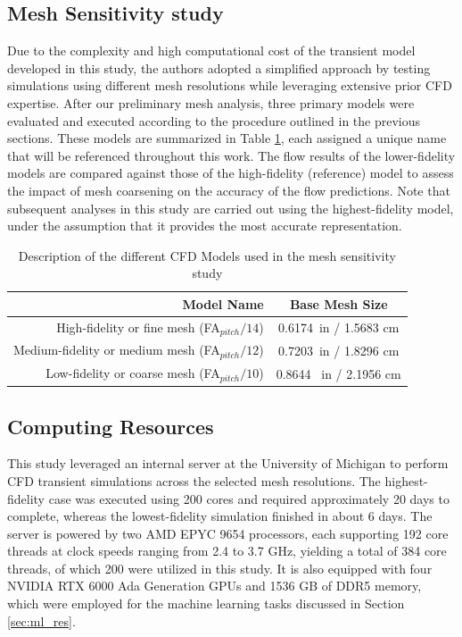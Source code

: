 \documentclass[review]{elsarticle}
\theoremstyle{definition}
\theoremstyle{definition}
\theoremstyle{remark}
\begin{document}
\subsection{Mesh Sensitivity study}

Due to the complexity and high computational cost of the transient model developed in this study, the authors adopted a simplified approach by testing simulations using different mesh resolutions while leveraging extensive prior CFD expertise. After our preliminary mesh analysis, three primary models were evaluated and executed according to the procedure outlined in the previous sections. These models are summarized in Table \ref{tab:model_mesh}, each assigned a unique name that will be referenced throughout this work. The flow results of the lower-fidelity models are compared against those of the high-fidelity (reference) model to assess the impact of mesh coarsening on the accuracy of the flow predictions. Note that subsequent analyses in this study are carried out using the highest-fidelity model, under the assumption that it provides the most accurate representation.

\begin{table}[h]
\centering
\caption{Description of the different CFD Models used in the mesh sensitivity study}
\begin{tabular}{|r|c|}
\hline
\textbf{Model Name} & \textbf{Base Mesh Size} \\
\hline
High-fidelity or fine mesh   (FA$_{pitch}/14$) & 0.6174\ in / 1.5683 cm \\
\hline
Medium-fidelity or medium mesh (FA$_{pitch}/12$) & 0.7203\ in / 1.8296 cm \\
\hline
Low-fidelity or coarse mesh    (FA$_{pitch}/10$) & 0.8644 \ in / 2.1956 cm\\
\hline
\end{tabular}
\label{tab:model_mesh}
\end{table}

\subsection{Computing Resources}
\label{sec:com_res}

This study leveraged an internal server at the University of Michigan to perform CFD transient simulations across the selected mesh resolutions. The highest-fidelity case was executed using 200 cores and required approximately 20 days to complete, whereas the lowest-fidelity simulation finished in about 6 days. The server is powered by two AMD EPYC 9654 processors, each supporting 192 core threads at clock speeds ranging from 2.4 to 3.7 GHz, yielding a total of 384 core threads, of which 200 were utilized in this study. It is also equipped with four NVIDIA RTX 6000 Ada Generation GPUs and 1536 GB of DDR5 memory, which were employed for the machine learning tasks discussed in Section \ref{sec:ml_res}.
\end{document}
